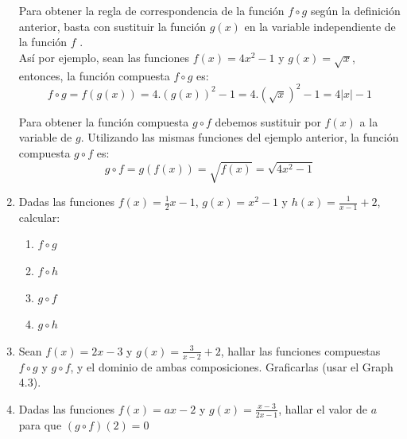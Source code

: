\documentclass[12pt]{article}
\theoremstyle{definition}
\begin{document}
\begin{enumerate}
\vspace{0.5 cm}
Para obtener la regla de correspondencia de la función $f \circ g$ según la definición anterior, basta con sustituir la función $g(x)$ en la variable independiente de la función $f$ .\\
Así por ejemplo, sean las funciones $f(x) = 4x^2 -1$ y $g(x) =\sqrt{x}$, entonces, la función compuesta $f \circ g$  es:\\
\begin{equation*}
f  \circ g = f(g(x)) = 4.(g(x))^2-1 = 4.(\sqrt{x})^2-1 = 4|x|-1
\end{equation*}

Para obtener la función compuesta $g \circ f$  debemos sustituir por $f(x)$ a la variable de $g$. Utilizando las mismas funciones del ejemplo anterior,  la función compuesta $g \circ f$  es:
\begin{equation*}
g  \circ f = g(f(x)) = \sqrt{f(x)} = \sqrt{4x^2-1}
\end{equation*}

\item 	Dadas las funciones $f(x) = \frac{1}{2}x -1$, $g(x) = x^2-1$ y $h(x) = \frac{1}{x-1}+2$, calcular:
\begin{multicols}{4}
\begin{enumerate} [leftmargin=2cm]
\item$f \circ g$ 
\item $f \circ h$
\item$g \circ f$
\item  $g \circ h$
\end{enumerate}
\end{multicols}

\item Sean  $f(x) = 2x-3 $ y $g(x) =\frac{3}{x-2} +2$, hallar las funciones compuestas $f \circ g$  y $g \circ f$, y el dominio de ambas composiciones. Graficarlas (usar el Graph 4.3).

\item Dadas las funciones $f(x) = ax-2$ y $g(x) =\frac{x-3}{2x-1}$, hallar el valor de $a$ para que  $(g \circ f) (2) = 0$



\end{enumerate}
\end{document}
